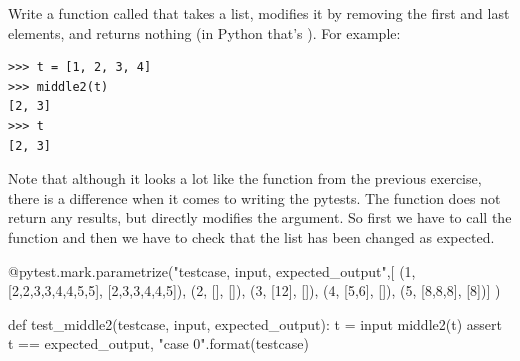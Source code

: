 \begin{exercise}

Write a function called  that takes a list, modifies it by removing the first and last elements, and returns nothing (in Python that's ).
For example:

\begin{Verbatim}[frame=single]
>>> t = [1, 2, 3, 4]
>>> middle2(t)
[2, 3]
>>> t
[2, 3]
\end{Verbatim}

Note that although it looks a lot like the  function from the previous exercise, there is a difference when it comes to writing the pytests. The function does not return any results, but directly modifies the argument. So first we have to call the function and then we have to check that the list has been changed as expected.


\begin{python}
@pytest.mark.parametrize("testcase, input, expected_output",[
(1, [2,2,3,3,4,4,5,5], [2,3,3,4,4,5]),   
(2, [], []),              
(3, [12], []),
(4, [5,6], []),
(5, [8,8,8], [8])]
)              

def test_middle2(testcase, input, expected_output):
    t = input
    middle2(t)
    assert t == expected_output, "case {0}".format(testcase)
\end{python}

\end{exercise}



